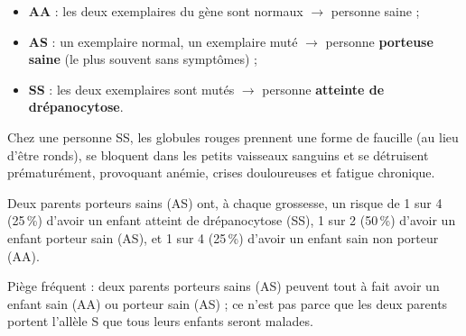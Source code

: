 \begin{propriete}
\begin{itemize}
\item \textbf{AA} : les deux exemplaires du gène sont normaux $\to$ personne saine ;
\item \textbf{AS} : un exemplaire normal, un exemplaire muté $\to$ personne
\textbf{porteuse saine} (le plus souvent sans symptômes) ;
\item \textbf{SS} : les deux exemplaires sont mutés $\to$ personne \textbf{atteinte de
drépanocytose}.
\end{itemize}
\end{propriete}

\begin{propriete}
Chez une personne SS, les globules rouges prennent une forme de faucille (au lieu
d'être ronds), se bloquent dans les petits vaisseaux sanguins et se détruisent
prématurément, provoquant anémie, crises douloureuses et fatigue chronique.
\end{propriete}

\begin{illus}
\end{illus}

\begin{exemple}
Deux parents porteurs sains (AS) ont, à chaque grossesse, un risque de 1 sur 4 (25\,\%)
d'avoir un enfant atteint de drépanocytose (SS), 1 sur 2 (50\,\%) d'avoir un enfant
porteur sain (AS), et 1 sur 4 (25\,\%) d'avoir un enfant sain non porteur (AA).
\end{exemple}

\begin{remarque}
Piège fréquent : deux parents porteurs sains (AS) peuvent tout à fait avoir un enfant
sain (AA) ou porteur sain (AS) ; ce n'est pas parce que les deux parents portent
l'allèle S que tous leurs enfants seront malades.
\end{remarque}


